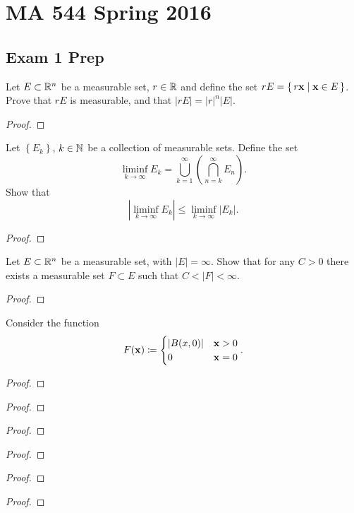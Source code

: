 \chapter{MA 544 Spring 2016}
\section{Exam 1 Prep}
\begin{problem}
Let $E\subset\mathbb{R}^n$ be a measurable set, $r\in\mathbb{R}$ and define the set
$rE=\left\{\,r\mathbf{x}\;\middle|\;\mathbf{x}\in E\,\right\}$. Prove that $rE$ is
measurable, and that $|rE|=|r|^n|E|$.
\end{problem}
\begin{proof}
\end{proof}

\begin{problem}
Let $\left\{ E_k \right\}$, $k\in\mathbb{N}$ be a collection of measurable
sets. Define the set
\[
\liminf_{k\to\infty} E_k=\bigcup_{k=1}^\infty\left(\bigcap_{n=k}^\infty
  E_n\right).
\]
Show that
\[
\left|\liminf_{k\to\infty} E_k\right|\leq\liminf_{k\to\infty}\left|E_k\right|.
\]
\end{problem}
\begin{proof}
\end{proof}

\begin{problem}
Let $E\subset\mathbb{R}^n$ be a measurable set, with $|E|=\infty$. Show that for
any $C>0$ there exists a measurable set $F\subset E$ such that
$C<|F|<\infty$.
\end{problem}
\begin{proof}
\end{proof}

\begin{problem}
Consider the function
\[
F(\mathbf{x})\coloneqq
\begin{cases}
|B(x,0)|&\mathbf{x}>0\\
0&\mathbf{x}=0
\end{cases}.
\]
\end{problem}
\begin{proof}
\end{proof}

\begin{problem}
\end{problem}
\begin{proof}
\end{proof}

\begin{problem}
\end{problem}
\begin{proof}
\end{proof}

\begin{problem}
\end{problem}
\begin{proof}
\end{proof}

\begin{problem}
\end{problem}
\begin{proof}
\end{proof}

\begin{problem}
\end{problem}
\begin{proof}
\end{proof}


